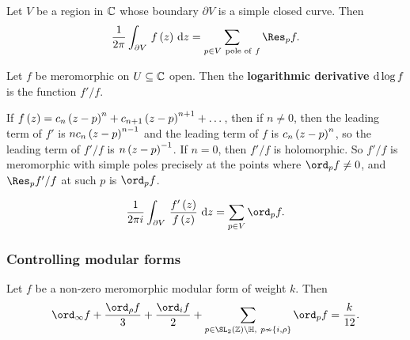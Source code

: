 \begin{theorem}
Let $ V $ be a region in $ \mathbb{C} $ whose boundary $ \partial V $ is a simple closed curve. Then
$$ \dfrac{1}{2\pi}\intd{\partial V}{}{f\br{z}}{z} = \sum_{p \in V \ \text{pole of} \ f} \Res_p f. $$
\end{theorem}

\begin{definition}
Let $ f $ be meromorphic on $ U \subseteq \mathbb{C} $ open. Then the \textbf{logarithmic derivative} $ \mathrm{d}\log f $ is the function $ f' / f $.
\end{definition}

If $ f\br{z} = c_n\br{z - p}^n + c_{n + 1}\br{z - p}^{n + 1} + \dots $, then if $ n \ne 0 $, then the leading term of $ f' $ is $ nc_n\br{z - p}^{n - 1} $ and the leading term of $ f $ is $ c_n\br{z - p}^n $, so the leading term of $ f' / f $ is $ n\br{z - p}^{-1} $. If $ n = 0 $, then $ f' / f $ is holomorphic. So $ f' / f $ is meromorphic with simple poles precisely at the points where $ \ord_p f \ne 0 $, and $ \Res_p f' / f $ at such $ p $ is $ \ord_p f $.

\begin{theorem}
$$ \dfrac{1}{2\pi i}\intd{\partial V}{}{\dfrac{f'\br{z}}{f\br{z}}}{z} = \sum_{p \in V} \ord_p f. $$
\end{theorem}

\pagebreak

\subsubsection{Controlling modular forms}

\begin{theorem}
Let $ f $ be a non-zero meromorphic modular form of weight $ k $. Then
$$ \ord_\infty f + \dfrac{\ord_\rho f}{3} + \dfrac{\ord_i f}{2} + \sum_{p \in \SL_2\br{\ZZ} \backslash \HH, \ p \nsim \cbr{i, \rho}} \ord_p f = \dfrac{k}{12}. $$
\end{theorem}


